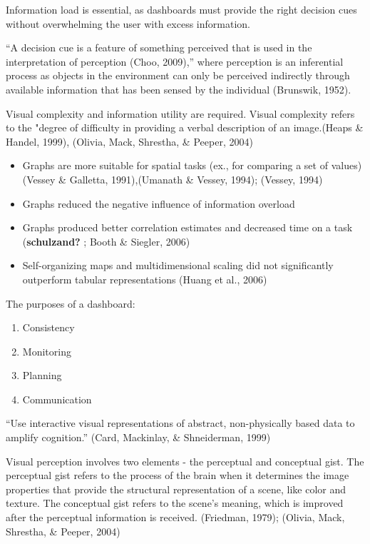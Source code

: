 \documentclass[print]{nuthesis}
\providecommand{\tightlist}{%
  \setlength{\itemsep}{0pt}\setlength{\parskip}{0pt}}
\begin{document}
Information load is essential, as dashboards must provide the right decision cues without overwhelming the user with excess information.

``A decision cue is a feature of something perceived that is used in the interpretation of perception (Choo, 2009),'' where perception is an inferential process as objects in the environment can only be perceived indirectly through available information that has been sensed by the individual (Brunswik, 1952).

Visual complexity and information utility are required. Visual complexity refers to the "degree of difficulty in providing a verbal description of an image.(Heaps \& Handel, 1999), (Olivia, Mack, Shrestha, \& Peeper, 2004)

\begin{itemize}
\tightlist
\item
  Graphs are more suitable for spatial tasks (ex., for comparing a set of values) (Vessey \& Galletta, 1991),(Umanath \& Vessey, 1994); (Vessey, 1994)
\item
  Graphs reduced the negative influence of information overload
\item
  Graphs produced better correlation estimates and decreased time on a task (\textbf{schulzand?} ; Booth \& Siegler, 2006)
\item
  Self-organizing maps and multidimensional scaling did not significantly outperform tabular representations (Huang et al., 2006)
\end{itemize}

The purposes of a dashboard:

\begin{enumerate}
\def\labelenumi{\arabic{enumi}.}
\tightlist
\item
  Consistency
\item
  Monitoring
\item
  Planning
\item
  Communication
\end{enumerate}

``Use interactive visual representations of abstract, non-physically based data to amplify cognition.'' (Card, Mackinlay, \& Shneiderman, 1999)

Visual perception involves two elements - the perceptual and conceptual gist. The perceptual gist refers to the process of the brain when it determines the image properties that provide the structural representation of a scene, like color and texture. The conceptual gist refers to the scene's meaning, which is improved after the perceptual information is received. (Friedman, 1979); (Olivia, Mack, Shrestha, \& Peeper, 2004)
\end{document}
